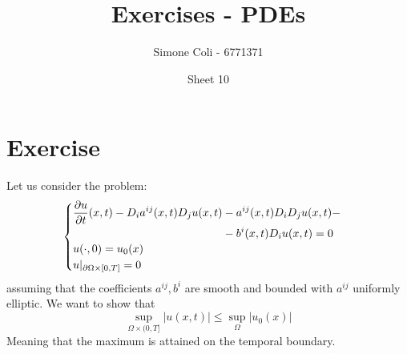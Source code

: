 \documentclass{article}
\title{Exercises - PDEs}
\author{Simone Coli - 6771371}
\date{Sheet 10}
\begin{document}
\maketitle

\section{Exercise}
Let us consider the problem:
\begin{equation} \label{eq:1}
    \begin{cases}
        \begin{aligned}
            \pdv{u}{t}(x,t) - D_i a^{ij}(x,t) D_j u(x,t) &- a^{ij}(x,t) D_i D_j u(x,t) -\\
            &- b^i(x,t) D_i u(x,t) = 0
        \end{aligned}\\
        u(\cdot, 0) = u_0 (x)\\
        u|_{\partial \Omega \times [0,T]} = 0
    \end{cases}
\end{equation}
assuming that the coefficients $a^{ij}, b^i$ are smooth and bounded with $a^{ij}$ uniformly elliptic. We want to show that
\[
    \sup_{\Omega \times (0,T]} |u(x,t)| \leq \sup_{\Omega} |u_0 (x)|
\]
Meaning that the maximum is attained on the temporal boundary.
\end{document}
